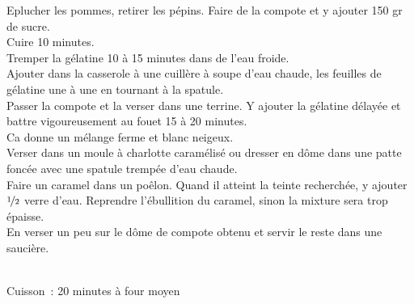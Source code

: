 \begin{minipage}[c]{\textwidth}
Eplucher les pommes, retirer les pépins. Faire de la compote et y ajouter 150 gr de sucre. \\
Cuire 10 minutes. \\
Tremper la gélatine 10 à 15 minutes dans de l’eau froide. \\
Ajouter dans la casserole à une cuillère à soupe d’eau chaude, les feuilles de gélatine une à une en tournant à la spatule. \\
Passer la compote et la verser dans une terrine. Y ajouter la gélatine délayée et battre vigoureusement au fouet 15 à 20 minutes. \\
Ca donne un mélange ferme et blanc neigeux. \\
Verser dans un moule à charlotte caramélisé ou dresser en dôme dans une patte foncée avec une spatule trempée d’eau chaude. \\
Faire un caramel dans un poêlon. Quand il atteint la teinte recherchée, y ajouter $\nicefrac{1}{2}$ verre d’eau. Reprendre l’ébullition du caramel, sinon la mixture sera trop épaisse.\\
En verser un peu sur le dôme de compote obtenu et servir le reste dans une saucière.\\
\\

\end{minipage}

\begin{minipage}[c]{\textwidth}
Cuisson : 20 minutes à four moyen\\
\\

\end{minipage}

